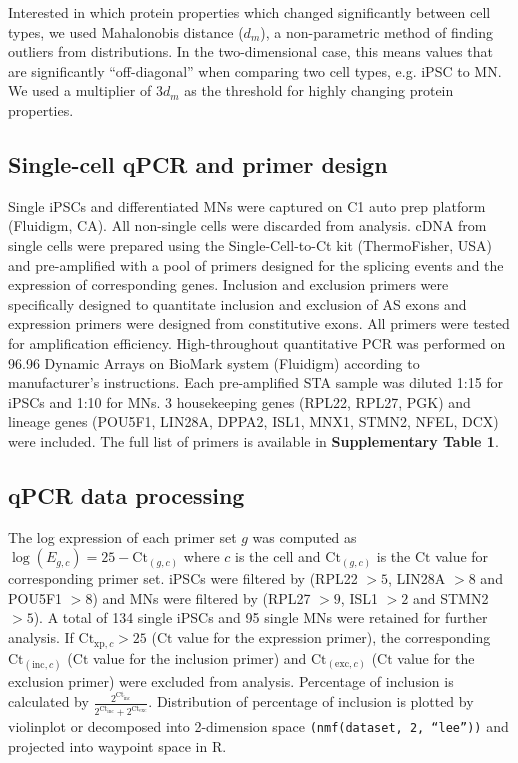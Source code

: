 Interested in which protein properties which changed significantly between cell types, we used Mahalonobis distance\cite{DeMaesschalck:2000hv} ($d_m$), a non-parametric method of finding outliers from distributions. In the two-dimensional case, this means values that are significantly ``off-diagonal'' when comparing two cell types, e.g. iPSC to MN. We used a multiplier of $3d_m$ as the threshold for highly changing protein properties.

\subsection{Single-cell qPCR and primer design}

Single iPSCs and differentiated MNs were captured on C1 auto prep platform (Fluidigm, CA). All non-single cells were discarded from analysis. cDNA from single cells were prepared using the Single-Cell-to-Ct kit (ThermoFisher, USA) and pre-amplified with a pool of primers designed for the splicing events and the expression of corresponding genes. Inclusion and exclusion primers were specifically designed to quantitate inclusion and exclusion of AS exons and expression primers were designed from constitutive exons. All primers were tested for amplification efficiency. High-throughout quantitative PCR was performed on 96.96 Dynamic Arrays on BioMark system (Fluidigm) according to manufacturer’s instructions. Each pre-amplified STA sample was diluted 1:15 for iPSCs and 1:10 for MNs. 3 housekeeping genes (RPL22, RPL27, PGK) and lineage genes (POU5F1, LIN28A, DPPA2, ISL1, MNX1, STMN2, NFEL, DCX) were included. The full list of primers is available in \textbf{Supplementary Table 1}.

\subsection{qPCR data processing}

The log expression of each primer set $g$ was computed as $\log(E_{g,c}) = 25 - \mathrm{Ct}_{(g,c)}$ where $c$ is the cell and $\mathrm{Ct}_{(g,c)}$ is the $\mathrm{Ct}$ value for corresponding primer set. iPSCs were filtered by (RPL22 $>5$, LIN28A $> 8$ and POU5F1 $> 8$) and MNs were filtered by (RPL27 $> 9$, ISL1 $> 2$ and STMN2 $> 5$). A total of 134 single iPSCs and 95 single MNs were retained for further analysis. If $\mathrm{Ct}_{\mathrm{xp},c}  > 25$ ($\mathrm{Ct}$ value for the expression primer), the corresponding $\mathrm{Ct}_{(\mathrm{inc},c)}$ ($\mathrm{Ct}$ value for the inclusion primer) and $\mathrm{Ct}_{(\mathrm{exc},c)}$ ($\mathrm{Ct}$ value for the exclusion primer) were excluded from analysis. Percentage of inclusion is calculated by $\frac{2^{\mathrm{Ct}_{\mathrm{inc}}}}{2^{\mathrm{Ct}_{\mathrm{inc}}} +2^{\mathrm{Ct}_{\mathrm{exc}}}}$. Distribution of percentage of inclusion is plotted by violinplot or decomposed into 2-dimension space \texttt{(nmf(dataset, 2, ``lee''))} and projected into waypoint space in R.

